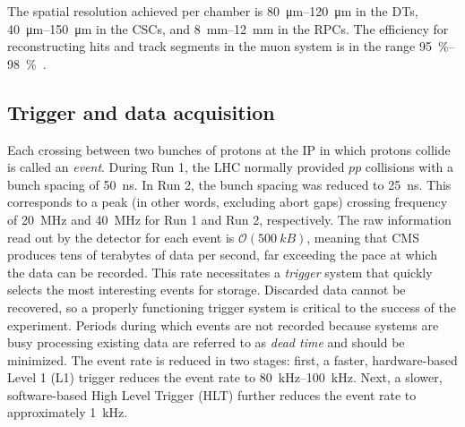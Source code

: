 The spatial resolution achieved per chamber is \SIrange{80}{120}{\micro\meter}
in the DTs, \SIrange{40}{150}{\micro\meter} in the CSCs, and
\SIrange{8}{12}{\milli\meter} in the RPCs. The efficiency for reconstructing
hits and track segments in the muon system is in the range
\SIrange{95}{98}{\percent}~\cite{Chatrchyan:2013sba}.

\subsection{Trigger and data acquisition}
Each crossing between two bunches of protons at the IP in which protons collide
is called an \textit{event}. During Run 1, the LHC normally provided $pp$
collisions with a bunch spacing of \SI{50}{\nano\second}. In Run 2, the bunch
spacing was reduced to \SI{25}{\nano\second}. This corresponds to a peak (in
other words, excluding abort gaps) crossing frequency of \SI{20}{\mega\Hz} and
\SI{40}{\mega\Hz} for Run 1 and Run 2, respectively. The raw information read
out by the detector for each event is $\mathcal{O}(\SI{500}{kB})$, meaning that
CMS produces tens of terabytes of data per second, far exceeding the pace at
which the data can be recorded. This rate necessitates a \textit{trigger} system
that quickly selects the most interesting events for storage. Discarded data
cannot be recovered, so a properly functioning trigger system is critical to the
success of the experiment. Periods during which events are not recorded because
systems are busy processing existing data are referred to as \emph{dead time}
and should be minimized. The event rate is reduced in two stages: first, a
faster, hardware-based Level 1 (L1) trigger reduces the event rate to
\SIrange{80}{100}{\kilo\hertz}. Next, a slower, software-based High Level
Trigger (HLT) further reduces the event rate to approximately
\SI{1}{\kilo\hertz}.

